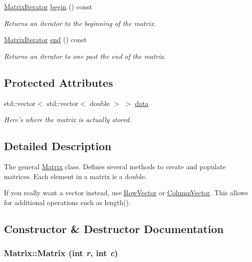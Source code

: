 \begin{DoxyCompactItemize}
\hyperlink{class_matrix_iterator}{MatrixIterator} \hyperlink{class_matrix_a8969f52f950b124d5a40128c3df11efe}{begin} () const 
\begin{DoxyCompactList}\small\item\em Returns an iterator to the beginning of the matrix. \item\end{DoxyCompactList}\item 
\hyperlink{class_matrix_iterator}{MatrixIterator} \hyperlink{class_matrix_aa6e886dcd213fdf5c54743f3b8ac7209}{end} () const 
\begin{DoxyCompactList}\small\item\em Returns an iterator to one past the end of the matrix. \item\end{DoxyCompactList}\end{DoxyCompactItemize}
\subsection*{Protected Attributes}
\begin{DoxyCompactItemize}
\item 
std::vector$<$ std::vector$<$ double $>$ $>$ \hyperlink{class_matrix_adab4557133e13b08ae470a8e5df7b99c}{data}
\begin{DoxyCompactList}\small\item\em Here's where the matrix is actually stored. \item\end{DoxyCompactList}\end{DoxyCompactItemize}


\subsection{Detailed Description}
The general \hyperlink{class_matrix}{Matrix} class. Defines several methods to create and populate matrices. Each element in a matrix is a double.

If you really want a vector instead, use \hyperlink{class_row_vector}{RowVector} or \hyperlink{class_column_vector}{ColumnVector}. This allows for additional operations such as length(). 

\subsection{Constructor \& Destructor Documentation}
\hypertarget{class_matrix_a07a3cee5bc286ca27ceffe81ce5a2d01}{
\subsubsection[{Matrix}]{\setlength{\rightskip}{0pt plus 5cm}Matrix::Matrix (int {\em r}, \/  int {\em c})}}
\label{class_matrix_a07a3cee5bc286ca27ceffe81ce5a2d01}


